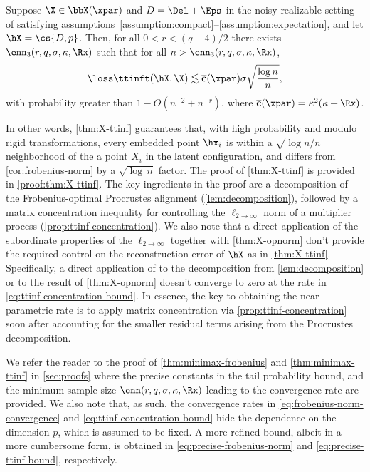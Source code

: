 \documentclass[10pt]{article}
\begin{document}
\begin{theorem}\label{thm:X-ttinf}
    Suppose $\X \in \bbX(\xpar)$ and $D = \Del + \Eps$ in the noisy realizable setting of  satisfying assumptions~\ref{assumption:compact}--\ref{assumption:expectation}, and let $\hX = \cs{D, p}$. Then, for all $0 < r < (q-4)/2$ there exists $\enn_3(r, q, \sigma, \kappa, \Rx)$ such that for all $n > \enn_3(r, q, \sigma,  \kappa, \Rx)$,
    \begin{align}
    \loss\ttinft(\hX, \X) \lesssim \mathbf{\overline{c}}(\xpar) \sigma\sqrt{\frac{ \log{n}}{n}},\label{eq:ttinf-concentration-bound}
    \end{align}
    with probability greater than $1 - O(n^{-2} + n^{-r})$, where $\mathbf{\overline{c}}(\xpar) = \kappa^2( \kappa + \Rx)$.
\end{theorem}

In other words, \cref{thm:X-ttinf} guarantees that, with high probability and modulo rigid transformations, every embedded point $\hx_i$ is within a $\sqrt{\log{n}/n}$ neighborhood of the a point $X_i$ in the latent configuration, and differs from \cref{cor:frobenius-norm} by a $\sqrt{\log\,{n}}$ factor. The proof of \cref{thm:X-ttinf} is provided in \cref{proof:thm:X-ttinf}. The key ingredients in the proof are a decomposition of the Frobenius-optimal Procrustes alignment (\cref{lem:decomposition}), followed by a matrix concentration inequality for controlling the $\ell_{2\to\infty}$ norm of a multiplier  process (\cref{prop:ttinf-concentration}). We also note that a direct application of the subordinate properties of the $\ell_{2\to\infty}$ together with \cref{thm:X-opnorm} don't provide the required control on the reconstruction error of $\hX$ as in \cref{thm:X-ttinf}. Specifically, a direct application of \citet[Proposition~6.3]{cape2019two} to the decomposition from \cref{lem:decomposition} or to the result of \cref{thm:X-opnorm} doesn't converge to zero at the rate in \cref{eq:ttinf-concentration-bound}. In essence, the key to obtaining the near parametric rate is to apply matrix concentration via \cref{prop:ttinf-concentration} soon after accounting for  the smaller residual terms arising from the Procrustes decomposition.

\begin{remark}
    We refer the reader to the proof of \cref{thm:minimax-frobenius} and \cref{thm:minimax-ttinf} in \cref{sec:proofs} where the precise constants in the tail probability bound, and the minimum sample size $\enn(r, q, \sigma, \kappa, \Rx)$ leading to the convergence rate are provided. We also note that, as such, the convergence rates in \cref{eq:frobenius-norm-convergence} and \cref{eq:ttinf-concentration-bound} hide the dependence on the dimension $p$, which is assumed to be fixed. A more refined bound, albeit in a more cumbersome form, is obtained in \cref{eq:precise-frobenius-norm} and \cref{eq:precise-ttinf-bound}, respectively.
\end{remark}
    
\end{document}
